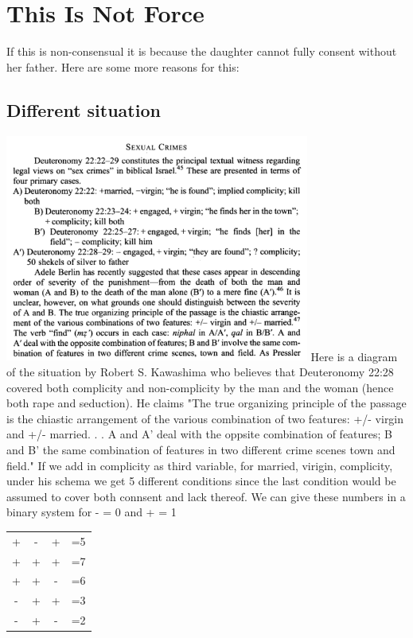 \documentclass[11pt]{article}
\begin{document}
\section{This Is Not Force}

If this is non-consensual it is because the daughter cannot fully consent without her father. Here are some more reasons for this:
\subsection{Different situation}
\includegraphics[width=10cm]{sexual_crimes} \newline
Here is a diagram of the situation by Robert S. Kawashima who believes that Deuteronomy 22:28 covered both complicity and non-complicity by the man and the woman (hence both rape and seduction). He claims "The true organizing principle of the passage is the chiastic arrangement of the various combination of two features: +/- virgin and +/- married. . . A and A' deal with the oppsite combination of features; B and B' the same combination of features in two different crime scenes town and field." If we add in complicity as third variable, for married, virigin, complicity, under his schema we get 5 different conditions since the last condition would be assumed to cover both connsent and lack thereof. We can give these numbers in a binary system for - = 0 and + = 1 \newline


\begin{tabular}{ c c c c }
 + & - & + & =5\\ 
 + & + & + & =7 \\  
 + & + & - & =6 \\
 - & + & + & =3 \\
 - & + & - & =2 \\
\end{tabular} \newline
\end{document}
